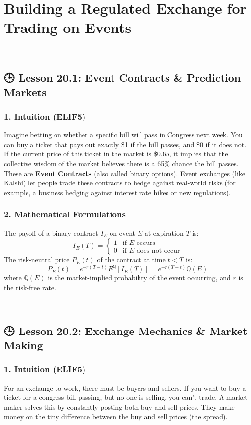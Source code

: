 \documentclass[11pt,oneside]{book}
\begin{document}
\newpage

\chapter{Building a Regulated Exchange for Trading on Events}

---

\section{🕒 Lesson 20.1: Event Contracts \& Prediction Markets}

\subsection{1. Intuition (ELIF5)}
Imagine betting on whether a specific bill will pass in Congress next week. You can buy a ticket that pays out exactly \$1 if the bill passes, and \$0 if it does not. If the current price of this ticket in the market is \$0.65, it implies that the collective wisdom of the market believes there is a 65\% chance the bill passes. These are \textbf{Event Contracts} (also called binary options). Event exchanges (like Kalshi) let people trade these contracts to hedge against real-world risks (for example, a business hedging against interest rate hikes or new regulations).

\subsection{2. Mathematical Formulations}
The payoff of a binary contract $I_E$ on event $E$ at expiration $T$ is:
$$I_E(T) = \begin{cases} 1 & \text{if } E \text{ occurs} \\ 0 & \text{if } E \text{ does not occur} \end{cases}$$
The risk-neutral price $P_E(t)$ of the contract at time $t < T$ is:
$$P_E(t) = e^{-r(T-t)} E^{\mathbb{Q}}[I_E(T)] = e^{-r(T-t)} \mathbb{Q}(E)$$
where $\mathbb{Q}(E)$ is the market-implied probability of the event occurring, and $r$ is the risk-free rate.

---

\section{🕒 Lesson 20.2: Exchange Mechanics \& Market Making}

\subsection{1. Intuition (ELIF5)}
For an exchange to work, there must be buyers and sellers. If you want to buy a ticket for a congress bill passing, but no one is selling, you can't trade. A market maker solves this by constantly posting both buy and sell prices. They make money on the tiny difference between the buy and sell prices (the spread).
\end{document}
